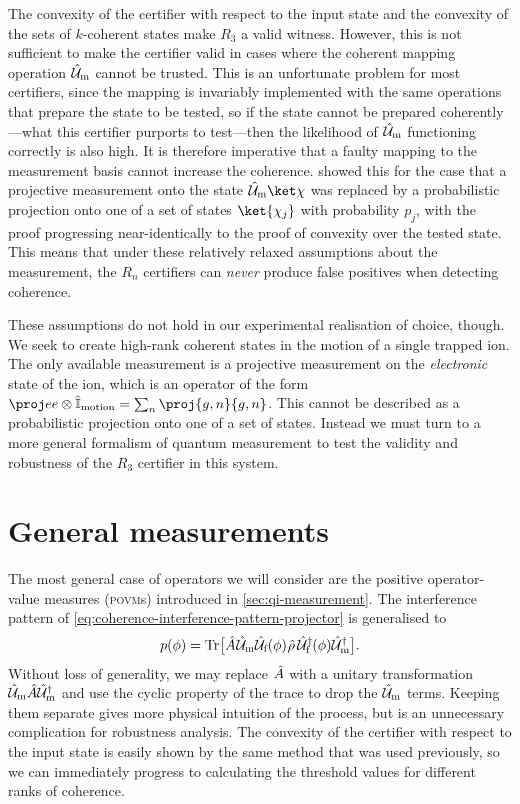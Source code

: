 The convexity of the certifier with respect to the input state and the convexity of the sets of $k$-coherent states make $R_3$ a valid witness.
However, this is not sufficient to make the certifier valid in cases where the coherent mapping operation $\hat{\mathcal U}_{\text m}$ cannot be trusted.
This is an unfortunate problem for most certifiers, since the mapping is invariably implemented with the same operations that prepare the state to be tested, so if the state cannot be prepared coherently---what this certifier purports to test---then the likelihood of $\hat{\mathcal U}_{\text m}$ functioning correctly is also high.
It is therefore imperative that a faulty mapping to the measurement basis cannot increase the coherence.
\citet{Dive2020} showed this for the case that a projective measurement onto the state $\U_{\text m}\ket\chi$ was replaced by a probabilistic projection onto one of a set of states $\ket{\chi_j}$ with probability $p_j$, with the proof progressing near-identically to the proof of convexity over the tested state.
This means that under these relatively relaxed assumptions about the measurement, the $R_n$ certifiers can \emph{never} produce false positives when detecting coherence.

These assumptions do not hold in our experimental realisation of choice, though.
We seek to create high-rank coherent states in the motion of a single trapped ion.
The only available measurement is a projective measurement on the \emph{electronic} state of the ion, which is an operator of the form $\proj ee \otimes\I_{\text{motion}} = \sum_n \proj{g,n}{g,n}$.
This cannot be described as a probabilistic projection onto one of a set of states.
Instead we must turn to a more general formalism of quantum measurement to test the validity and robustness of the $R_3$ certifier in this system.


\section{General measurements}
\label{sec:coherence-general-measurements}

The most general case of operators we will consider are the positive operator-value measures (\textsc{povm}s) introduced in \cref{sec:qi-measurement}.
The interference pattern of \cref{eq:coherence-interference-pattern-projector} is generalised to
\begin{equation}\label{eq:coherence-interference-pattern-povm}
p(\phi) = \operatorname{Tr}\bigl[\hat{A}\mkern1mu\hat{\mathcal U}_{\text m}\hat{\mathcal U}_{\text f}(\phi)\mkern1mu\hat{\rho}\mkern3mu\hat{\mathcal U}_{\smash{\text f}}^\dagger\mkern-1mu(\phi)\hat{\mathcal U}_{\text m}^\dagger\bigr].
\end{equation}
Without loss of generality, we may replace $\hat{A}$ with a unitary transformation $\hat{\mathcal U}_{\text m}\hat{A}\hat{\mathcal U}_{\text m}^\dagger$ and use the cyclic property of the trace to drop the $\hat{\mathcal U}_{\text m}$ terms.
Keeping them separate gives more physical intuition of the process, but is an unnecessary complication for robustness analysis.
The convexity of the certifier with respect to the input state is easily shown by the same method that was used previously, so we can immediately progress to calculating the threshold values for different ranks of coherence.

